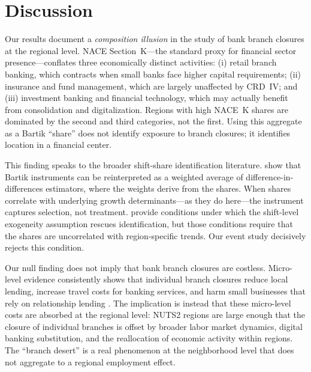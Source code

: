 \documentclass[12pt]{article}
\begin{document}




\section{Discussion}

Our results document a \emph{composition illusion} in the study of bank branch closures at the regional level. NACE Section~K---the standard proxy for financial sector presence---conflates three economically distinct activities: (i) retail branch banking, which contracts when small banks face higher capital requirements; (ii) insurance and fund management, which are largely unaffected by CRD~IV; and (iii) investment banking and financial technology, which may actually benefit from consolidation and digitalization. Regions with high NACE~K shares are dominated by the second and third categories, not the first. Using this aggregate as a Bartik ``share'' does not identify exposure to branch closures; it identifies location in a financial center.

This finding speaks to the broader shift-share identification literature. \citet{goldsmithpinkham2020shares} show that Bartik instruments can be reinterpreted as a weighted average of difference-in-differences estimators, where the weights derive from the shares. When shares correlate with underlying growth determinants---as they do here---the instrument captures selection, not treatment. \citet{borusyak2022shifshare} provide conditions under which the shift-level exogeneity assumption rescues identification, but those conditions require that the shares are uncorrelated with region-specific trends. Our event study decisively rejects this condition.

Our null finding does not imply that bank branch closures are costless. Micro-level evidence consistently shows that individual branch closures reduce local lending, increase travel costs for banking services, and harm small businesses that rely on relationship lending \citep{nguyen2019branchclosure, cortesiglesias2020branchclosure}. The implication is instead that these micro-level costs are absorbed at the regional level: NUTS2 regions are large enough that the closure of individual branches is offset by broader labor market dynamics, digital banking substitution, and the reallocation of economic activity within regions. The ``branch desert'' is a real phenomenon at the neighborhood level that does not aggregate to a regional employment effect.
\end{document}
